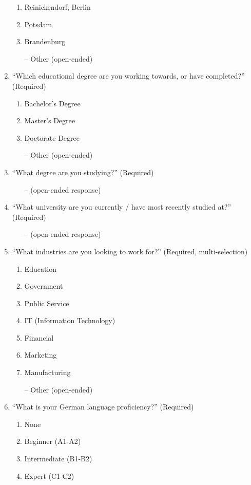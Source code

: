 \begin{enumerate}
\begin{enumerate}
		\item	Reinickendorf, Berlin
		\item	Potsdam
		\item	Brandenburg
		\item[--] Other (open-ended)
	\end{enumerate}
	\item “Which educational degree are you working towards, or have completed?”  (Required)
	\begin{enumerate}
		\item Bachelor's Degree
		\item Master's Degree
		\item Doctorate Degree
		\item[--] Other (open-ended)
	\end{enumerate}
	\item “What degree are you studying?” (Required)
	\begin{itemize}
		\item[--] (open-ended response)
	\end{itemize}
	\item “What university are you currently / have most recently studied at?” (Required)
	\begin{itemize}
		\item[--] (open-ended response)
	\end{itemize}
	\item “What industries are you looking to work for?” (Required, multi-selection)
	\begin{enumerate}
		\item Education
		\item Government
		\item Public Service
		\item IT (Information Technology)
		\item Financial
		\item Marketing
		\item Manufacturing
		\item[--] Other (open-ended)
	\end{enumerate}
	\item “What is your German language proficiency?” (Required)
	\begin{enumerate}
		\item None
		\item Beginner (A1-A2)
		\item Intermediate (B1-B2)
		\item Expert (C1-C2)
	\end{enumerate}

\end{enumerate}
